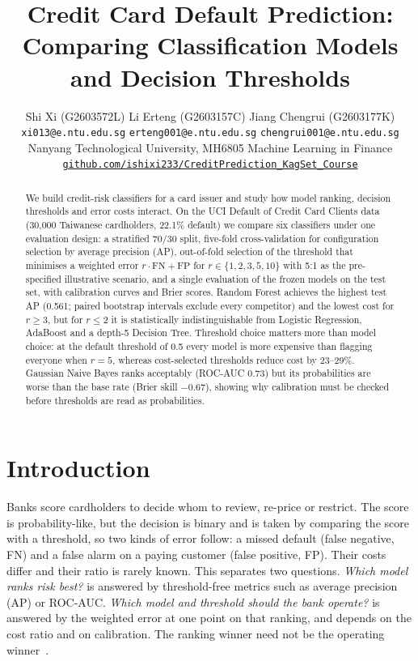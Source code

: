 \documentclass{article}
\title{Credit Card Default Prediction:\\Comparing Classification Models\\and Decision Thresholds}
\author{%
  Shi Xi (G2603572L) \qquad Li Erteng (G2603157C) \qquad Jiang Chengrui (G2603177K)\\
  \texttt{xi013@e.ntu.edu.sg} \quad \texttt{erteng001@e.ntu.edu.sg} \quad \texttt{chengrui001@e.ntu.edu.sg}\\
  Nanyang Technological University, MH6805 Machine Learning in Finance\\
  \texttt{\href{https://github.com/ishixi233/CreditPrediction_KagSet_Course}{github.com/ishixi233/CreditPrediction\_KagSet\_Course}}
}
\date{}
\newcommand{\FN}{\mathrm{FN}}
\newcommand{\FP}{\mathrm{FP}}
\begin{document}
\maketitle
\thispagestyle{plain}

\begin{abstract}
We build credit-risk classifiers for a card issuer and study how model ranking, decision thresholds and error costs interact. On the UCI Default of Credit Card Clients data (30{,}000 Taiwanese cardholders, 22.1\% default) we compare six classifiers under one evaluation design: a stratified 70/30 split, five-fold cross-validation for configuration selection by average precision (AP), out-of-fold selection of the threshold that minimises a weighted error $r\cdot\FN+\FP$ for $r\in\{1,2,3,5,10\}$ with 5:1 as the pre-specified illustrative scenario, and a single evaluation of the frozen models on the test set, with calibration curves and Brier scores. Random Forest achieves the highest test AP (0.561; paired bootstrap intervals exclude every competitor) and the lowest cost for $r\ge3$, but for $r\le2$ it is statistically indistinguishable from Logistic Regression, AdaBoost and a depth-5 Decision Tree. Threshold choice matters more than model choice: at the default threshold of 0.5 every model is more expensive than flagging everyone when $r=5$, whereas cost-selected thresholds reduce cost by 23--29\%. Gaussian Naive Bayes ranks acceptably (ROC-AUC 0.73) but its probabilities are worse than the base rate (Brier skill $-0.67$), showing why calibration must be checked before thresholds are read as probabilities.
\end{abstract}

\section{Introduction}
Banks score cardholders to decide whom to review, re-price or restrict. The score is probability-like, but the decision is binary and is taken by comparing the score with a threshold, so two kinds of error follow: a missed default (false negative, FN) and a false alarm on a paying customer (false positive, FP). Their costs differ and their ratio is rarely known. This separates two questions. \emph{Which model ranks risk best?} is answered by threshold-free metrics such as average precision (AP) or ROC-AUC. \emph{Which model and threshold should the bank operate?} is answered by the weighted error at one point on that ranking, and depends on the cost ratio and on calibration. The ranking winner need not be the operating winner~\citep{provost2001robust}.
\end{document}
